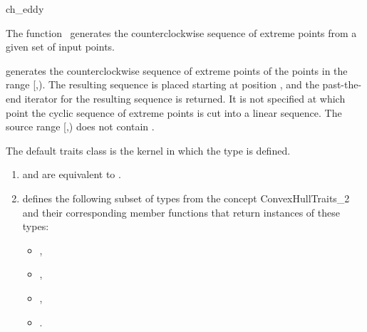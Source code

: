 
\begin{ccRefFunction}{ch_eddy}  %

\ccDefinition
  
The function \ccRefName\ generates the counterclockwise sequence of extreme
points from a given set of input points.



            {generates the counterclockwise sequence of extreme points
            of the points in the range [,).
            The resulting sequence is placed starting at position
            , and the past-the-end iterator for the resulting
            sequence is returned. It is not specified at which point the
            cyclic sequence of extreme points is cut into a linear sequence.
            \ccPrecond %
            The source range [,) does not contain
            .}

The default traits class  is the kernel in which the
type  is defined.


\begin{enumerate}
   \item    {} and 
            are equivalent to .
   \item    {} defines the following subset of types from
            the concept ConvexHullTraits\_2 and their corresponding member
            functions that return instances of these types:
            \begin{itemize}
                \item {},
                \item {},
                \item {}, 
                \item {}.
            \end{itemize}
\end{enumerate}


\end{ccRefFunction}
